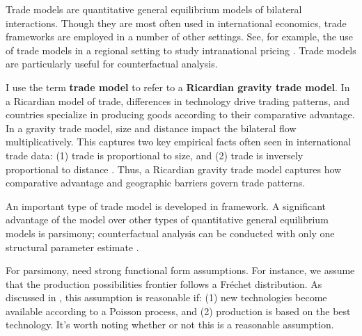 \documentclass[10 pt]{article}
\begin{document}
\begin{outline}


\begin{blist}


	\item Trade models are quantitative general equilibrium models of bilateral interactions.
	Though they are most often used in international economics, trade frameworks are employed in a number of other settings. See, for example, the use of trade models in a regional setting to study intranational pricing \parencite{AD15-wp}.
	Trade models are particularly useful for counterfactual analysis. 

	\item I use the term \textbf{trade model} to refer to a \textbf{{\color{Orange}Ricardian} {\color{Alice}gravity} trade model}.
	In a {\color{Orange}Ricardian} model of trade, differences in technology drive trading patterns, and countries specialize in producing goods according to their comparative advantage. 
	In a {\color{Alice}gravity} trade model, size and distance impact the bilateral flow multiplicatively. 
	This captures two key empirical facts often seen in international trade data: (1) trade is proportional to size, and (2) trade is inversely proportional to distance \textcite{HM14}. 
	Thus, a {\color{Orange}Ricardian} {\color{Alice}gravity} trade model captures how comparative advantage and geographic barriers govern trade patterns.

	\item An important type of trade model is developed in \textcite{EK02} framework. A significant advantage of the \textcite{EK02} model over other types of quantitative general equilibrium models is parsimony; counterfactual analysis can be conducted with only one structural parameter estimate \parencite{ACD17}.


\end{blist}


\begin{blist}

\item For parsimony, need strong functional form assumptions. 
For instance, we assume that the production possibilities frontier follows a Fr\'{e}chet distribution. 
As discussed in \textcite{EK02}, this assumption is reasonable if: (1) new technologies become available according to a Poisson process, and (2) production is based on the best technology.
It's worth noting whether or not this is a reasonable assumption.


\end{blist}
\end{outline}
\end{document}
